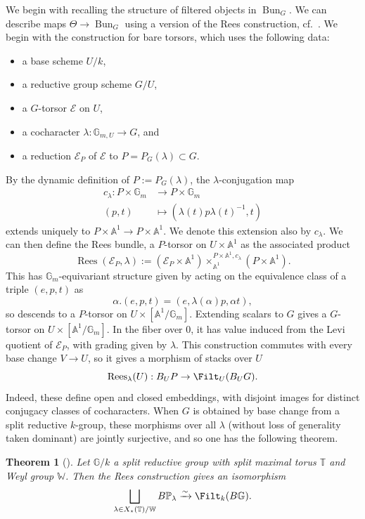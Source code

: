 \documentclass[openany]{amsbook}
\newtheorem{theorem}{Theorem}[chapter]
\theoremstyle{definition}
\theoremstyle{remark}
\numberwithin{equation}{section}
\renewcommand{\P}{\mathbb{P}}
\newcommand{\G}{\mathbb{G}}
\newcommand{\T}{\mathbb{T}}
\newcommand{\W}{\mathbb{W}}
\newcommand{\cE}{\mathcal{E}}
\newcommand{\A}{\mathbb{A}}
\renewcommand{\-}{\operatorname{-}}
\renewcommand{\P}{\mathbb{P}}
\newcommand{\on}[1]{\operatorname{#1}}
\renewcommand{\A}{\mathbb{A}}
\newcommand{\Bun}{\on{Bun}}
\begin{document}
We begin with recalling the structure of filtered objects in $\Bun_G$. We can describe maps $\Theta \to \Bun_G$ using a version of the Rees construction, cf.\ \cite[\S 1.F.b]{HeinlothGIT}. We begin with the construction for bare torsors, which uses the following data:
\begin{itemize} 
\item a base scheme $U/k$,
\item a reductive group scheme $G/U$,
\item a $G$-torsor $\cE$ on $U$,
\item a cocharacter $\lambda : \G_{m, U} \to G$, and \item a reduction $\cE_P$ of $\cE$ to $P = P_G(\lambda) \subset G$.
\end{itemize}
By the dynamic definition of $P := P_G(\lambda)$, the $\lambda$-conjugation map
\begin{align*}
    c_\lambda : P \times \G_m &\to P \times \G_m \\
        (p, t) &\mapsto (\lambda(t) p \lambda(t)^{-1}, t)
\end{align*}
 extends uniquely to $P \times \A^1 \to P \times \A^1$. We denote this extension also by $c_\lambda$. We can then define the Rees bundle, a $P$-torsor on $U \times \A^1$
as the associated product
$$
    \on{Rees}(\cE_P, \lambda) := (\cE_P \times \A^1) \times^{P \times \A^1, c_\lambda}_{\A^1} (P \times \A^1).
$$
This has $\G_m$-equivariant structure given by acting on the equivalence class of a triple $(e, p, t)$ as 
$$
    \alpha.(e,p,t) = (e, \lambda(\alpha) p, \alpha t),
$$
so descends to a $P$-torsor on $U \times [\A^1/\G_m]$. Extending scalars to $G$ gives a $G$-torsor on $U \times [\A^1/\G_m]$. In the fiber over $0$, it has value induced from the Levi quotient of $\cE_P$, with grading given by $\lambda$. This construction commutes with every base change $V \to U$, so it gives a morphism of stacks over $U$
$$
    \on{Rees}_\lambda(U) : B_U P \to \Filt_U(B_U G).
$$
Indeed, these define open and closed embeddings, with disjoint images for distinct conjugacy classes of cocharacters. When $G$ is obtained by base change from a split reductive $k$-group, these morphisms over all $\lambda$ (without loss of generality taken dominant) are jointly surjective, and so one has the following theorem.

\begin{theorem}[{\cite[Theorem 1.4.8]{HalpernLeistnerInstability}}]\label{thm.Filt.BG.HL}
    Let $\G/k$ a split reductive group with split maximal torus $\T$ and Weyl group $\W$. Then the Rees construction gives an isomorphism
    $$
        \bigsqcup_{\lambda \in X_\star(\T)/\W} B\P_{\lambda} \xrightarrow{\sim} \Filt_k(B\G).
    $$
\end{theorem}
\end{document}
